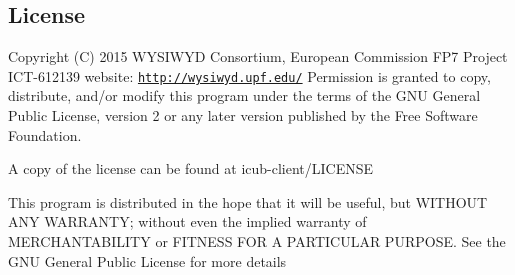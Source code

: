 \subsection*{License}

Copyright (C) 2015 W\+Y\+S\+I\+W\+YD Consortium, European Commission F\+P7 Project I\+C\+T-\/612139 website\+: \href{http://wysiwyd.upf.edu/}{\tt http\+://wysiwyd.\+upf.\+edu/} Permission is granted to copy, distribute, and/or modify this program under the terms of the G\+NU General Public License, version 2 or any later version published by the Free Software Foundation.

A copy of the license can be found at icub-\/client/\+L\+I\+C\+E\+N\+SE

This program is distributed in the hope that it will be useful, but W\+I\+T\+H\+O\+UT A\+NY W\+A\+R\+R\+A\+N\+TY; without even the implied warranty of M\+E\+R\+C\+H\+A\+N\+T\+A\+B\+I\+L\+I\+TY or F\+I\+T\+N\+E\+SS F\+OR A P\+A\+R\+T\+I\+C\+U\+L\+AR P\+U\+R\+P\+O\+SE. See the G\+NU General Public License for more details 
